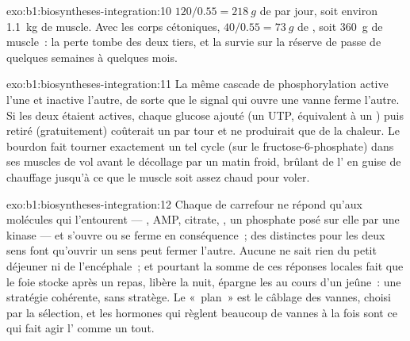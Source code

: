 \begin{solution}{exo:b1:biosyntheses-integration:10}
$120/0.55 = \qty{218}{g}$ de  par jour, soit environ
\qty{1.1}{kg} de muscle. Avec les corps cétoniques,
$40/0.55 = \qty{73}{g}$ de , soit \qty{360}{g} de muscle~: la
perte tombe des deux tiers, et la survie sur la réserve de  passe
de quelques semaines à quelques mois.
\end{solution}

\begin{solution}{exo:b1:biosyntheses-integration:11}
La même cascade de phosphorylation active l'une et inactive l'autre, de
sorte que le signal qui ouvre une vanne ferme l'autre. Si les deux
étaient actives, chaque glucose ajouté (un UTP, équivalent à un )
puis retiré (gratuitement) coûterait un  par tour et ne produirait
que de la chaleur. Le bourdon fait tourner exactement un tel cycle (sur
le fructose-6-phosphate) dans ses muscles de vol avant le décollage par
un matin froid, brûlant de l' en guise de chauffage jusqu'à ce que le
muscle soit assez chaud pour voler.
\end{solution}

\begin{solution}{exo:b1:biosyntheses-integration:12}
Chaque  de carrefour ne répond qu'aux molécules qui l'entourent
--- , AMP, citrate, , un phosphate posé sur elle par une
kinase --- et s'ouvre ou se ferme en conséquence~; des 
distinctes pour les deux sens font qu'ouvrir un sens peut fermer
l'autre. Aucune  ne sait rien du petit déjeuner ni de
l'encéphale~; et pourtant la somme de ces réponses locales fait que le
foie stocke après un repas, libère la nuit, épargne les  au
cours d'un jeûne~: une stratégie cohérente, sans stratège. Le
«~plan~» est le câblage des vannes, choisi par la sélection, et les
hormones qui règlent beaucoup de vannes à la fois sont ce qui fait agir
l' comme un tout.
\end{solution}

